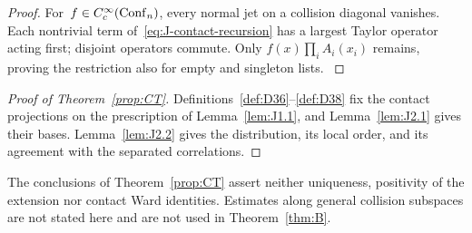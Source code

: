 \begin{proof}
For~$f\in C_c^\infty(\mathrm{Conf}_{n})$, every normal jet on a collision diagonal vanishes. Each nontrivial term of~\eqref{eq:J-contact-recursion} has a largest Taylor operator acting first; disjoint operators commute. Only $f(x)\prod_iA_i(x_i)$ remains, proving the restriction also for empty and singleton lists.
\label{proof:J2.2-end}
\end{proof}

\begin{proof}[Proof of Theorem~\ref{prop:CT}]
Definitions~\ref{def:D36}--\ref{def:D38} fix the contact projections on the prescription of Lemma~\ref{lem:J1.1}, and Lemma~\ref{lem:J2.1} gives their bases. Lemma~\ref{lem:J2.2} gives the distribution, its local order, and its agreement with the separated correlations.
\end{proof}

The conclusions of Theorem~\ref{prop:CT} assert neither uniqueness, positivity of the extension nor contact Ward identities. Estimates along general collision subspaces are not stated here and are not used in Theorem~\ref{thm:B}.
